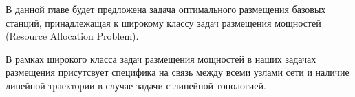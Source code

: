 В данной главе будет предложена задача оптимального размещения базовых станций, принадлежащая к широкому классу задач размещения мощностей (Resource Allocation Problem).





В рамках широкого класса задач размещения мощностей в наших задачах размещения присутсвует специфика на связь между всеми узлами сети и наличие линейной траектории в случае задачи с линейной топологией.


